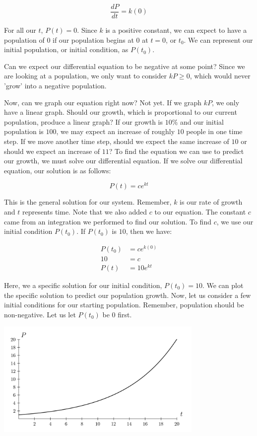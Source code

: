 \documentclass{amsart}
\theoremstyle{definition}
\numberwithin{equation}{section}
\begin{document}
\begin{sansmath}
\[ \frac{dP}{dt} = k(0)\]

For all our $t$, $P(t) = 0$. Since $k$ is a positive constant, we can expect to have a population of $0$ if our population begins at $0$ at $t = 0$, or $t_0$. We can represent our initial population, or initial condition, as $P(t_0)$.

Can we expect our differential equation to be negative at some point? Since we are looking at a population, we only want to consider $kP \geq 0$, which would never 'grow' into a negative population.

Now, can we graph our equation right now? Not yet. If we graph $kP$, we only have a linear graph. Should our growth, which is proportional to our current population, produce a linear graph? If our growth is $10\%$ and our initial population is $100$, we may expect an increase of roughly $10$ people in one time step. If we move another time step, should we expect the same increase of $10$ or should we expect an increase of $11$? To find the equation we can use to predict our growth, we must solve our differential equation. If we solve our differential equation, our solution is as follows:

\[ P(t) = ce^{kt} \]


This is the general solution for our system. Remember, $k$ is our rate of growth and $t$ represents time. Note that we also added $c$ to our equation. The constant $c$ came from an integration we performed to find our solution. To find $c$, we use our initial condition $P(t_0)$. If $P(t_0)$ is $10$, then we have:

\begin{align*}
  P(t_0) & = ce^{k(0)}\\
  10 & = c\\
  P(t) & = 10e^{kt}
\end{align*}

Here, we a specific solution for our initial condition, $P(t_0) = 10$. We can plot the specific solution to predict our population growth. Now, let us consider a few initial conditions for our starting population. Remember, population should be non-negative. Let us let $P(t_0)$ be $0$ first.
\begin{center}
  \includegraphics[width=10cm]{ExponentialGrowthSingle}
\end{center}


\end{sansmath}
\end{document}
